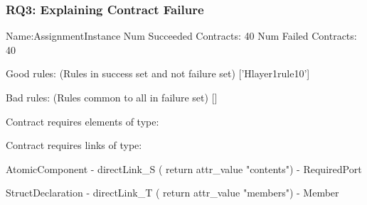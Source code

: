\subsubsection{RQ3: Explaining Contract Failure}

Name:AssignmentInstance
	Num Succeeded Contracts: 40
	Num Failed Contracts: 40
	
Good rules: (Rules in success set and not failure set)
['Hlayer1rule10']


Bad rules: (Rules common to all in failure set)
[]

Contract requires elements of type:


Contract requires links of type:

	AtomicComponent - directLink\_S ( return attr\_value  "contents")  - RequiredPort
	
	StructDeclaration - directLink\_T ( return attr\_value  "members")  - Member


